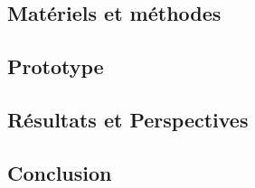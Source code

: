 \documentclass{beamer}
\begin{document}
\begin{frame}
  \begin{center}
    \section{\huge{Matériels et méthodes}}
  \end{center}
\end{frame}

\begin{frame}
  \begin{center}
    \section{\huge{Prototype}}
  \end{center}
\end{frame}


\begin{frame}
  \begin{center}
    \section{\huge{Résultats et Perspectives}}
  \end{center}
\end{frame}



\begin{frame}
  \begin{center}
    \section{\huge{Conclusion}}
  \end{center}
\end{frame}
\end{document}
